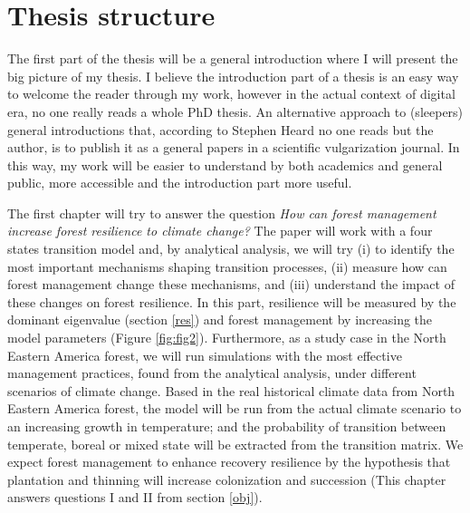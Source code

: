 
\section{Thesis structure}

The first part of the thesis will be a general introduction where I will present the big picture of my thesis.
I believe the introduction part of a thesis is an easy way to welcome the reader through my work, however in the actual context of digital era, no one really reads a whole PhD thesis.
An alternative approach to (sleepers) general introductions that, according to Stephen Heard\footnotemark{} no one reads but the author, is to publish it as a general papers in a scientific vulgarization journal.
In this way, my work will be easier to understand by both academics and general public, more accessible and the introduction part more useful.

The first chapter will try to answer the question \textit{How can forest management increase forest resilience to climate change?}
The paper will work with a four states transition model and, by analytical analysis, we will try (i) to identify the most important mechanisms shaping transition processes, (ii) measure how can forest management change these mechanisms, and (iii) understand the impact of these changes on forest resilience.
In this part, resilience will be measured by the dominant eigenvalue (section \ref{res}) and forest management by increasing the model parameters (Figure \ref{fig:fig2}).
Furthermore, as a study case in the North Eastern America forest, we will run simulations with the most effective management practices, found from the analytical analysis, under different scenarios of climate change.
Based in the real historical climate data from North Eastern America forest, the model will be run from the actual climate scenario to an increasing growth in temperature; and the probability of transition between temperate, boreal or mixed state will be extracted from the transition matrix.
We expect forest management to enhance recovery resilience by the hypothesis that plantation and thinning will increase colonization and succession (This chapter answers questions I and II from section \ref{obj}).


